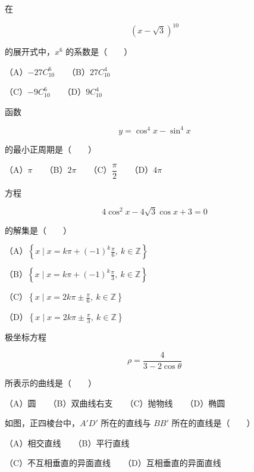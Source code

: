 \begin{question}
在

\nopagebreak[4]
\[
(x-\sqrt3)^{10}
\]

的展开式中，$x^6$ 的系数是\mbox{（　　）}

（A）$-27C_{10}^{6}$　　（B）$27C_{10}^{4}$

（C）$-9C_{10}^{6}$　　（D）$9C_{10}^{4}$

\end{question}
\begin{question}
函数

\nopagebreak[4]
\[
y=\cos^4x-\sin^4x
\]

的最小正周期是\mbox{（　　）}

（A）$\pi$　　（B）$2\pi$　　（C）$\dfrac\pi2$　　（D）$4\pi$

\end{question}
\begin{question}
方程

\nopagebreak[4]
\[
4\cos^2x-4\sqrt3\cos x+3=0
\]

的解集是\mbox{（　　）}

（A）$\left\{x\mid x=k\pi+(-1)^k\frac\pi6,\ k\in\mathbb Z\right\}$

（B）$\left\{x\mid x=k\pi+(-1)^k\frac\pi3,\ k\in\mathbb Z\right\}$

（C）$\left\{x\mid x=2k\pi\pm\frac\pi6,\ k\in\mathbb Z\right\}$

（D）$\left\{x\mid x=2k\pi\pm\frac\pi3,\ k\in\mathbb Z\right\}$

\end{question}
\begin{question}
极坐标方程

\nopagebreak[4]
\[
\rho=\frac4{3-2\cos\theta}
\]

所表示的曲线是\mbox{（　　）}

（A）圆　　（B）双曲线右支　　（C）抛物线　　（D）椭圆

\Needspace{0.4\textheight}
\end{question}
\begin{question}
如图，正四棱台中，$A'D'$ 所在的直线与 $BB'$ 所在的直线是\mbox{（　　）}
\nopagebreak[4]
\begin{center}\end{center}
\nopagebreak[4]
（A）相交直线　　（B）平行直线

（C）不互相垂直的异面直线　　（D）互相垂直的异面直线

\end{question}
